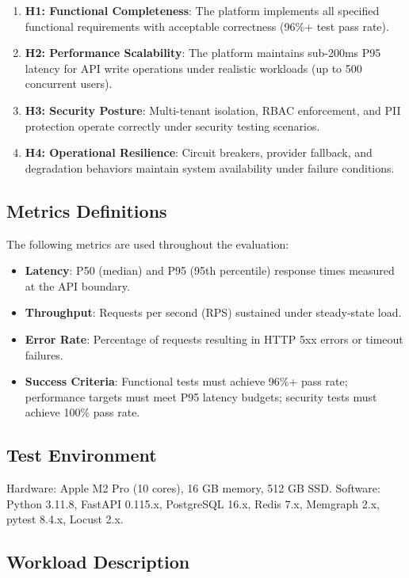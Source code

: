 \documentclass[a4paper,twoside]{sapthesis}
\begin{document}
\begin{enumerate}
    \item \textbf{H1: Functional Completeness}: The platform implements all specified functional requirements with acceptable correctness (96\%+ test pass rate).
    \item \textbf{H2: Performance Scalability}: The platform maintains sub-200ms P95 latency for API write operations under realistic workloads (up to 500 concurrent users).
    \item \textbf{H3: Security Posture}: Multi-tenant isolation, RBAC enforcement, and PII protection operate correctly under security testing scenarios.
    \item \textbf{H4: Operational Resilience}: Circuit breakers, provider fallback, and degradation behaviors maintain system availability under failure conditions.
\end{enumerate}

\subsection{Metrics Definitions}

The following metrics are used throughout the evaluation:

\begin{itemize}
    \item \textbf{Latency}: P50 (median) and P95 (95th percentile) response times measured at the API boundary.
    \item \textbf{Throughput}: Requests per second (RPS) sustained under steady-state load.
    \item \textbf{Error Rate}: Percentage of requests resulting in HTTP 5xx errors or timeout failures.
    \item \textbf{Success Criteria}: Functional tests must achieve 96\%+ pass rate; performance targets must meet P95 latency budgets; security tests must achieve 100\% pass rate.
\end{itemize}

\subsection{Test Environment}

Hardware: Apple M2 Pro (10 cores), 16 GB memory, 512 GB SSD. Software: Python 3.11.8, FastAPI 0.115.x, PostgreSQL 16.x, Redis 7.x, Memgraph 2.x, pytest 8.4.x, Locust 2.x.

\subsection{Workload Description}
\end{document}
